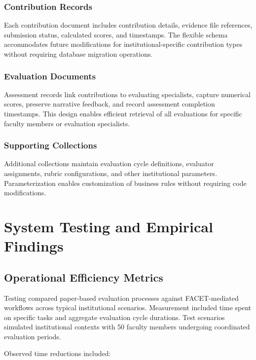 \documentclass[conference]{IEEEtran}
\begin{document}
\subsubsection{Contribution Records}
Each contribution document includes contribution details, evidence file references, submission status, calculated scores, and timestamps. The flexible schema accommodates future modifications for institutional-specific contribution types without requiring database migration operations.

\subsubsection{Evaluation Documents}
Assessment records link contributions to evaluating specialists, capture numerical scores, preserve narrative feedback, and record assessment completion timestamps. This design enables efficient retrieval of all evaluations for specific faculty members or evaluation specialists.

\subsubsection{Supporting Collections}
Additional collections maintain evaluation cycle definitions, evaluator assignments, rubric configurations, and other institutional parameters. Parameterization enables customization of business rules without requiring code modifications.

\section{System Testing and Empirical Findings}
\label{sec:results}

\subsection{Operational Efficiency Metrics}
\label{subsec:efficiency}

Testing compared paper-based evaluation processes against FACET-mediated workflows across typical institutional scenarios. Measurement included time spent on specific tasks and aggregate evaluation cycle durations. Test scenarios simulated institutional contexts with 50 faculty members undergoing coordinated evaluation periods.

Observed time reductions included:
\end{document}
